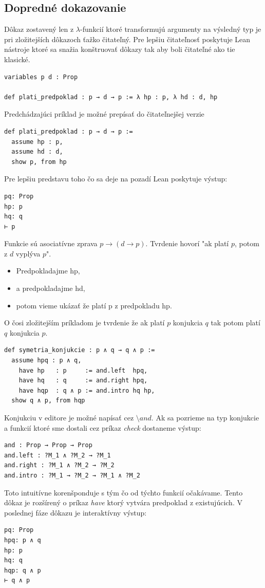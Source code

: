 \documentclass[a4paper,10pt,oneside]{report}%
\begin{document}
\subsection{Dopredné dokazovanie}
    Dôkaz zostavený len z $\lambda$-funkcií ktoré transformujú argumenty
na výsledný typ je pri zložitejších dôkazoch ťažko čitateľný.
    Pre lepšiu čitateľnosť poskytuje Lean nástroje ktoré sa snažia konštruovať dôkazy tak
aby boli čitateľné ako tie klasické.
\begin{lstlisting}
variables p d : Prop

def plati_predpoklad : p → d → p := λ hp : p, λ hd : d, hp
\end{lstlisting}
    Predchádzajúci príklad je možné prepísať do čitateľnejšej verzie
\begin{lstlisting}
def plati_predpoklad : p → d → p :=
  assume hp : p,
  assume hd : d,
  show p, from hp
\end{lstlisting}
Pre lepšiu predstavu toho čo sa deje na pozadí Lean poskytuje výstup:
\begin{lstlisting}
pq: Prop
hp: p
hq: q
⊢ p
\end{lstlisting}
    Funkcie sú asociatívne zprava $p \to ( d \to p )$.
    Tvrdenie hovorí "ak platí $p$, potom z $d$ vyplýva $p$".
\begin{itemize}
    \item Predpokladajme hp,
    \item a predpokladajme hd,
    \item potom vieme ukázať že platí p z predpokladu hp.
\end{itemize}
    O čosi zložitejším príkladom je tvrdenie že ak platí $p$ konjukcia $q$ tak potom
platí $q$ konjukcia $p$.
\begin{lstlisting}
def symetria_konjukcie : p ∧ q → q ∧ p :=
  assume hpq : p ∧ q,
    have hp   : p     := and.left  hpq,
    have hq   : q     := and.right hpq,
    have hqp  : q ∧ p := and.intro hq hp,
  show q ∧ p, from hqp
\end{lstlisting}
    Konjukciu v editore je možné napísať cez $\texttt{\textbackslash}and$.
    Ak sa pozrieme na typ konjukcie a funkcií ktoré sme dostali cez príkaz \emph{check}
dostaneme výstup:
\begin{lstlisting}
and : Prop → Prop → Prop
and.left : ?M_1 ∧ ?M_2 → ?M_1
and.right : ?M_1 ∧ ?M_2 → ?M_2
and.intro : ?M_1 → ?M_2 → ?M_1 ∧ ?M_2
\end{lstlisting}
    Toto intuitívne korenšponduje s tým čo od týchto funkcií očakávame.
    Tento dôkaz je rozšírený o príkaz \emph{have} ktorý vytvára predpoklad z existujúcich.
    V poslednej fáze dôkazu je interaktívny výstup:
\begin{lstlisting}
pq: Prop
hpq: p ∧ q
hp: p
hq: q
hqp: q ∧ p
⊢ q ∧ p
\end{lstlisting}
\end{document}
